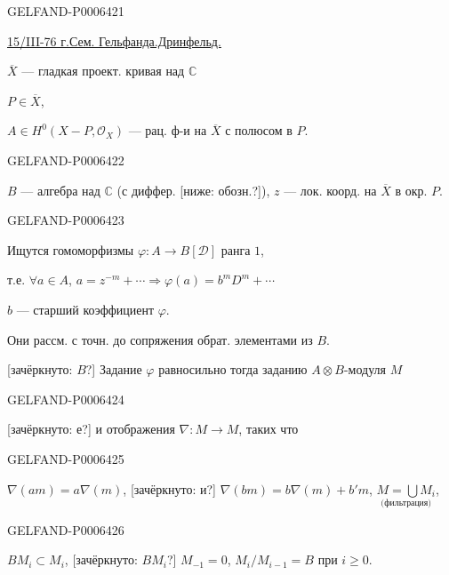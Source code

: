 \begin{GelfandAdjacentEvidence}{GELFAND-P000642}{1}
\noindent\textperiodcentered\hfill\textemdash\,\textperiodcentered\,\textemdash\par
\underline{15/III-76 г.}\quad \underline{Сем. Гельфанда.}\quad \underline{Дринфельд.}

\(\overline X\) --- гладкая проект. кривая над \(\mathbb C\)

\(P\in\overline X\),

\(A\in H^0(X-P,\mathcal O_X)\) --- рац. ф-и на \(\overline X\) с полюсом в \(P\).
\end{GelfandAdjacentEvidence}
\begin{GelfandAdjacentEvidence}{GELFAND-P000642}{2}


\(B\) --- алгебра над \(\mathbb C\) (с диффер. [ниже: обозн.?]),
\(z\) --- лок. коорд. на \(\overline X\) в окр. \(P\).
\end{GelfandAdjacentEvidence}
\begin{GelfandAdjacentEvidence}{GELFAND-P000642}{3}


Ищутся гомоморфизмы \(\varphi:A\to B[\mathcal D]\) ранга \(1\),

т.е. \(\forall a\in A\), \(a=z^{-m}+\cdots\Rightarrow\varphi(a)=b^mD^m+\cdots\)

\(b\) --- старший коэффициент \(\varphi\).

Они рассм. с точн. до сопряжения обрат. элементами из \(B\).

[зачёркнуто: \(B\)?] Задание \(\varphi\) равносильно тогда заданию
\(A\otimes B\)-модуля \(M\)
\end{GelfandAdjacentEvidence}
\begin{GelfandAdjacentEvidence}{GELFAND-P000642}{4}


[зачёркнуто: е?] и отображения \(\nabla:M\to M\), таких что
\end{GelfandAdjacentEvidence}
\begin{GelfandAdjacentEvidence}{GELFAND-P000642}{5}


\(\nabla(am)=a\nabla(m)\), [зачёркнуто: и?]
\(\nabla(bm)=b\nabla(m)+b'm\),
\(\underset{\text{(фильтрация)}}{M=\bigcup M_i}\),
\end{GelfandAdjacentEvidence}
\begin{GelfandAdjacentEvidence}{GELFAND-P000642}{6}


\(BM_i\subset M_i\), [зачёркнуто: \(BM_i\)?]
\(M_{-1}=0\), \(M_i/M_{i-1}=B\) при \(i\geqslant0\).
\end{GelfandAdjacentEvidence}


